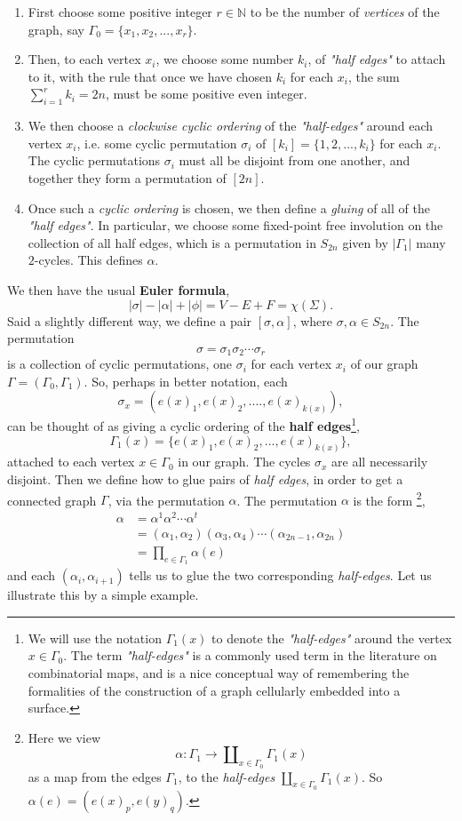\documentclass[11pt,oneside]{amsbook}
\numberwithin{equation}{section}
\theoremstyle{plain}
\theoremstyle{definition}
\theoremstyle{remark}
\newcommand{\sidenote}[1]{\footnote{#1}}
\newcommand{\NN}{\mathbb{N}}
\begin{document}
	\begin{enumerate}
		\item First choose some positive integer $r \in \NN$ to be the number of \emph{vertices} 
		of the graph, say $\Gamma_0 = \{x_1, x_2, ..., x_r\}$. 
		\item Then, to each vertex $x_i$, we choose some number $k_i$, of \emph{"half edges"} to attach to it, with the rule that once we have chosen $k_i$ for each $x_i$, the sum $\sum_{i=1}^r 
		k_i = 2n$, must be some positive even integer. 
		\item We then choose a \emph{clockwise cyclic ordering} of the \textit{"half-edges"} around 
		each vertex $x_i$, i.e. some cyclic permutation $\sigma_i$ of $[k_i] = \{1, 2, ..., k_i\}$ for each $x_i$. The 
		cyclic permutations $\sigma_i$ must all be disjoint from one another, and together they form a permutation of $[2n]$.
		\item Once such a \emph{cyclic ordering} is chosen, we then define a \emph{gluing} of all of the \emph{"half edges"}. In particular, we choose some fixed-point free involution on the collection of all half edges, which is a permutation in $S_{2n}$ given by $|\Gamma_1|$ many $2$-cycles. This defines $\alpha$. 
	\end{enumerate}
	
	We then have the usual \textbf{Euler formula}, 
	\[ |\sigma|-|\alpha|+|\phi| = V-E+F = \chi(\Sigma).\]
	Said a slightly different way, we define a pair $[\sigma, \alpha]$, where $\sigma, \alpha \in S_{2n}$. The permutation
	\[ \sigma = \sigma_1\sigma_2 \cdots \sigma_r \] is a collection of cyclic permutations, one $\sigma_i$ for each 
	vertex $x_i$ of our graph $\Gamma = (\Gamma_0, \Gamma_1)$. So, perhaps in better notation, each 
	\[ \sigma_x = (e(x)_1, e(x)_2, ...., e(x)_{k(x)}),\]
	can be thought of as giving a cyclic ordering of the \textbf{half edges}\sidenote{We will use the notation $\Gamma_1(x)$ to denote the \textit{"half-edges"} around the vertex $x \in \Gamma_0$. The term \textit{"half-edges"} is a commonly used term in the literature on combinatorial maps, and is a nice conceptual way of remembering the formalities of the construction of a graph cellularly embedded into a surface.},
	\[ \Gamma_1(x) = \{e(x)_1, e(x)_2, ..., e(x)_{k(x)}\},\] attached to each vertex $x \in \Gamma_0$ in our graph. The cycles $\sigma_x$ are all necessarily disjoint. Then we define how to glue pairs of 
	\emph{half edges}, in order to get a connected graph $\Gamma$, via the permutation $\alpha$. The permutation $\alpha$ is 
	the form \sidenote{Here we view \[ \alpha : \Gamma_1 \to \amalg_{x \in \Gamma_0} \Gamma_1(x) \] as a map from the edges $\Gamma_1$, to the \textit{half-edges} 
		$\amalg_{x \in \Gamma_0} \Gamma_1(x)$. So $\alpha(e) = (e(x)_p, e(y)_q)$.},
	\begin{align*}
		\alpha &= \alpha^1 \alpha^2 \cdots \alpha^t \\
		&= (\alpha_1, \alpha_2)(\alpha_3, \alpha_4) \cdots (\alpha_{2n-1}, \alpha_{2n}) \\
		&= \prod_{e \in \Gamma_1} \alpha(e)
	\end{align*}
	and each $(\alpha_i, \alpha_{i+1})$ tells us to glue the two corresponding \emph{half-edges}. Let us illustrate this by a 
	simple example. 
	
\end{document}
